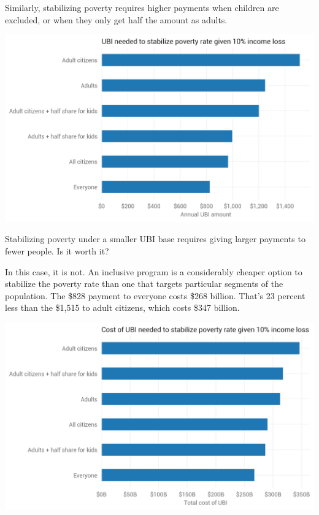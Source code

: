 \documentclass[12pt]{article}
\begin{document}
Similarly, stabilizing poverty requires higher payments when children are excluded, or when they only get half the amount as adults.

\begin{center}
\includegraphics[width=15cm]{ubi_pov_rate_10pct.png}
\label{fig:ubi_pov_rate_10pct}
\end{center}

Stabilizing poverty under a smaller UBI base requires giving larger payments to fewer people. Is it worth it?

In this case, it is not. An inclusive program is a considerably cheaper option to stabilize the poverty rate than one that targets particular segments of the population. The \$828 payment to everyone costs \$268 billion. That’s 23 percent less than the \$1,515 to adult citizens, which costs \$347 billion.

\begin{center}
\includegraphics[width=15cm]{ubi_cost_pov_rate_10pct.png}
\label{fig:ubi_cost_pov_rate_10pct}
\end{center}
\end{document}

